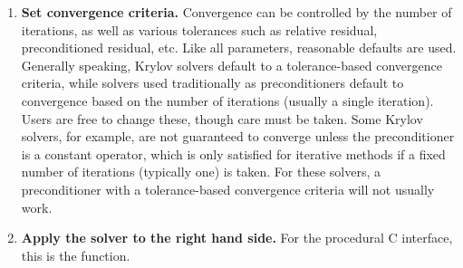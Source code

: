 \begin{enumerate}

\item
{\bf Set convergence criteria.} Convergence can be controlled by the
number of iterations, as well as various tolerances such as relative
residual, preconditioned residual, etc.  Like all parameters,
reasonable defaults are used. Generally speaking, Krylov solvers
default to a tolerance-based convergence criteria, while solvers used
traditionally as preconditioners default to convergence based on the
number of iterations (usually a single iteration). Users are free to
change these, though care must be taken. Some Krylov solvers, for
example, are not guaranteed to converge unless the preconditioner is a
constant operator, which is only satisfied for iterative methods if a
fixed number of iterations (typically one) is taken.  For these
solvers, a preconditioner with a tolerance-based convergence criteria
will not usually work.

\item
{\bf Apply the solver to the right hand side.} For the procedural C
interface, this is the  function. 

\end{enumerate}
